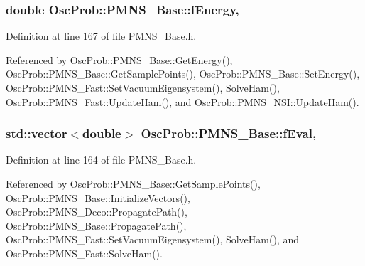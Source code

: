 \subsubsection[{\texorpdfstring{f\+Energy}{fEnergy}}]{\setlength{\rightskip}{0pt plus 5cm}double Osc\+Prob\+::\+P\+M\+N\+S\+\_\+\+Base\+::f\+Energy\hspace{0.3cm}{\ttfamily [protected]}, {\ttfamily [inherited]}}\hypertarget{classOscProb_1_1PMNS__Base_a2800af6d436972f3e900867790c046b0}{}\label{classOscProb_1_1PMNS__Base_a2800af6d436972f3e900867790c046b0}


Definition at line 167 of file P\+M\+N\+S\+\_\+\+Base.\+h.



Referenced by Osc\+Prob\+::\+P\+M\+N\+S\+\_\+\+Base\+::\+Get\+Energy(), Osc\+Prob\+::\+P\+M\+N\+S\+\_\+\+Base\+::\+Get\+Sample\+Points(), Osc\+Prob\+::\+P\+M\+N\+S\+\_\+\+Base\+::\+Set\+Energy(), Osc\+Prob\+::\+P\+M\+N\+S\+\_\+\+Fast\+::\+Set\+Vacuum\+Eigensystem(), Solve\+Ham(), Osc\+Prob\+::\+P\+M\+N\+S\+\_\+\+Fast\+::\+Update\+Ham(), and Osc\+Prob\+::\+P\+M\+N\+S\+\_\+\+N\+S\+I\+::\+Update\+Ham().

\subsubsection[{\texorpdfstring{f\+Eval}{fEval}}]{\setlength{\rightskip}{0pt plus 5cm}std\+::vector$<$double$>$ Osc\+Prob\+::\+P\+M\+N\+S\+\_\+\+Base\+::f\+Eval\hspace{0.3cm}{\ttfamily [protected]}, {\ttfamily [inherited]}}\hypertarget{classOscProb_1_1PMNS__Base_a6319c34d7decbb9d7d6da279c06e8c2d}{}\label{classOscProb_1_1PMNS__Base_a6319c34d7decbb9d7d6da279c06e8c2d}


Definition at line 164 of file P\+M\+N\+S\+\_\+\+Base.\+h.



Referenced by Osc\+Prob\+::\+P\+M\+N\+S\+\_\+\+Base\+::\+Get\+Sample\+Points(), Osc\+Prob\+::\+P\+M\+N\+S\+\_\+\+Base\+::\+Initialize\+Vectors(), Osc\+Prob\+::\+P\+M\+N\+S\+\_\+\+Deco\+::\+Propagate\+Path(), Osc\+Prob\+::\+P\+M\+N\+S\+\_\+\+Base\+::\+Propagate\+Path(), Osc\+Prob\+::\+P\+M\+N\+S\+\_\+\+Fast\+::\+Set\+Vacuum\+Eigensystem(), Solve\+Ham(), and Osc\+Prob\+::\+P\+M\+N\+S\+\_\+\+Fast\+::\+Solve\+Ham().

